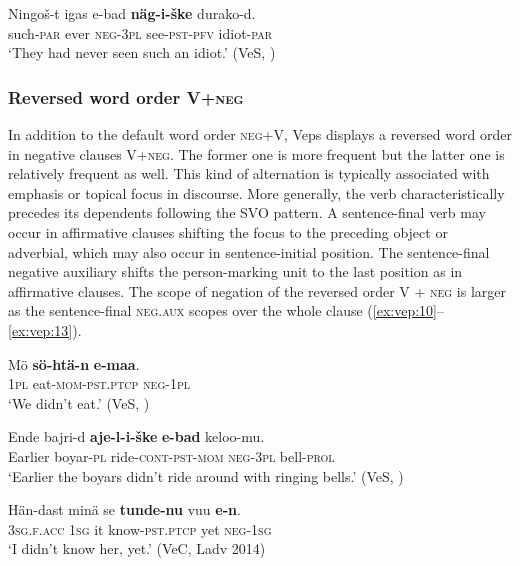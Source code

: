 \documentclass[output=paper,colorlinks=true, citecolor=brown]{langscibook}
\begin{document}
\ea
    \label{ex:vep:9}
    \gll Ningoš{}-t igas e{}-bad \textbf{näg-i-ške} durako{}-d. \\
         such-\textsc{par} ever \textsc{neg{}-3pl} see-\textsc{pst-pfv} idiot-\textsc{par}\\
    \glt ‘They had never seen such an idiot.’ (VeS, \citealt[71]{Kettunen1920})
\z

\subsubsection{Reversed word order V+\textsc{neg}}\label{sec:vep:2.1.2}
\largerpage
In addition to the default word order \textsc{neg}+V, Veps displays a reversed word order in negative clauses V+\textsc{neg}. The former one is more frequent but the latter one is relatively frequent as well. This kind of alternation is typically associated with emphasis or topical focus in discourse. More generally, the verb characteristically precedes its dependents following the SVO pattern. A sentence-final verb may occur in affirmative clauses shifting the focus to the preceding object or adverbial, which may also occur in sentence-initial position. The sentence-final negative auxiliary shifts the person-marking unit to the last position as in affirmative clauses. 
The scope of negation of the reversed order V + \textsc{neg} is larger as the sentence-final \textsc{neg.aux} scopes over the whole clause (\ref{ex:vep:10}--\ref{ex:vep:13}).

\ea\label{ex:vep:10}
    \gll Mö \textbf{sö-htä-n}  \textbf{e-maa}. \\
         \textsc{1pl} eat\textsc{{}-mom}{}-\textsc{pst.ptcp} \textsc{neg{}-1pl}\\
    \glt ‘We didn’t eat.’ (VeS, \citealt[93]{Kettunen1920})
\z

\ea\label{ex:vep:11}
    \gll Ende bajri-d \textbf{aje-l-i-ške}  \textbf{e-bad} keloo-mu. \\
         Earlier boyar{}-\textsc{pl} ride\textsc{{}-cont-pst-mom} \textsc{neg-3pl} bell{}-\textsc{prol}\\
    \glt ‘Earlier the boyars didn’t ride around with ringing bells.’ (VeS, \citealt[17]{Kettunen1925})
\z

\ea\label{ex:vep:12}
    \gll Hän-dast minä se \textbf{tunde-nu} vuu \textbf{e-n}. \\
         \textsc{3sg.f}.\textsc{acc}  \textsc{1sg} it know-\textsc{pst.ptcp} yet \textsc{neg-1sg} \\
    \glt ‘I didn’t know her, yet.’ (VeC, Ladv 2014)
\z
\end{document}
